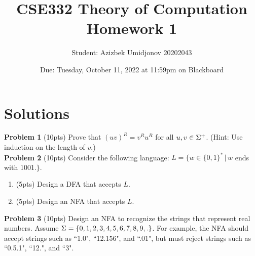 \documentclass{article}
\title{CSE332 Theory of Computation \\ Homework 1}
\author{Student: Azizbek Umidjonov 20202043}
\date{Due: Tuesday, October 11, 2022 at 11:59pm on Blackboard}
\begin{document}
\maketitle

\section*{Solutions} 

\noindent \textbf{Problem 1} (10pts) Prove that $(uv)^{R} = v^{R}u^{R}$ for all $u,v \in \Sigma^{+}$. (Hint: Use induction on the length of $v$.) \\

    
\noindent \textbf{Problem 2} (10pts) Consider the following language: $L = \{w\in\{0,1\}^{*} \, | \, w$  ends with 1001.$\}$.
    \begin{enumerate}
        \item (5pts) Design a DFA that accepts $L$.
        \begin{center}
        \end{center}
        \item (5pts) Design an NFA that accepts $L$.
        
    \end{enumerate}
    
\noindent \textbf{Problem 3} (10pts) Design an NFA to recognize the strings that represent real numbers. Assume $\Sigma = \{0,1,2,3,4,5,6,7,8,9,.\}$. For example, the NFA should accept strings such as ``1.0", ``12.156", and ``.01", but must reject strings such as ``0.5.1", ``12.", and ``3".
\end{document}
